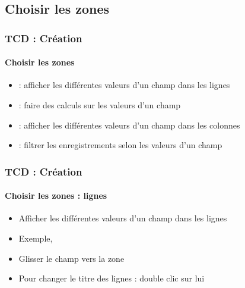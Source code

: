 \documentclass[xcolor=table, usenames,dvipsnames]{beamer}
\begin{document}
\subsection{Choisir les zones}

\begin{frame}
\frametitle{TCD : Création}
\framesubtitle{Choisir les zones}

\begin{minipage}{0.39\textwidth}
	\begin{itemize}
		\item {} : afficher les différentes valeurs d'un champ dans les lignes
		\item {} : faire des calculs sur les valeurs d'un champ
		\item {} : afficher les différentes valeurs d'un champ dans les colonnes
		\item {} : filtrer les enregistrements selon les valeurs d'un champ
	\end{itemize}
\end{minipage}
%
\begin{minipage}{0.6\textwidth} 
\end{minipage}

\end{frame}

\begin{frame}
\frametitle{TCD : Création}
\framesubtitle{Choisir les zones : lignes}

\begin{minipage}{0.39\textwidth}
	\begin{itemize}
		\item Afficher les différentes valeurs d'un champ dans les lignes
		\item Exemple, 
		\item Glisser le champ  vers la zone 
		\item Pour changer le titre des lignes : double clic sur lui
	\end{itemize}
\end{minipage}
%
\begin{minipage}{0.6\textwidth} 
	
\end{minipage}

\end{frame}
\end{document}
